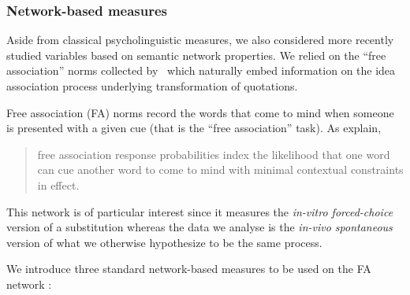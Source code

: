 \subsubsection{Network-based measures}

Aside from classical psycholinguistic measures, we also considered more recently studied variables based on semantic network properties.
We relied on the ``free association'' norms collected by~\citet{Nelson04} which naturally embed information on the idea association process underlying transformation of quotations.

Free association (FA) norms record the words that come to mind when someone is presented with a given cue (that is the ``free association'' task).
As \citeauthor{Nelson04} explain,
\begin{quote}
free association response probabilities index the likelihood that one word can cue another word to come to mind with minimal contextual constraints in effect.~\citep{Nelson04}
\end{quote}
This network is of particular interest since it measures the \emph{in-vitro forced-choice} version of a substitution whereas the data we analyse is the \emph{in-vivo spontaneous} version of what we otherwise hypothesize to be the same process.

\bigskip
We introduce three standard network-based measures to be used on the FA network%
:

